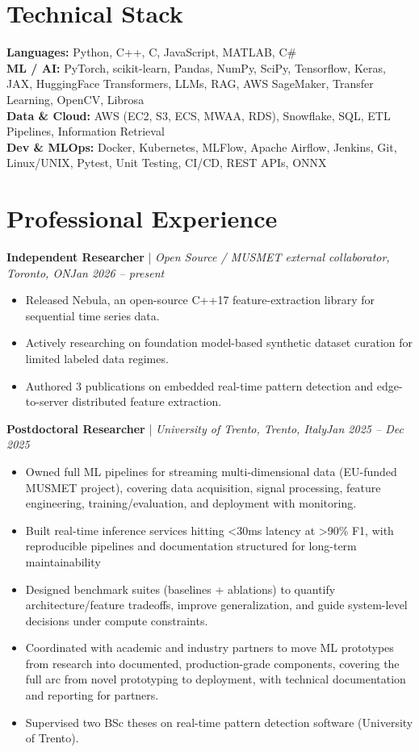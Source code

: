 \documentclass[11pt]{article}
\newenvironment{cvrole}[5]{%
  \par\noindent\textbf{\large #1} | \textit{\small #2, #3}\hfill \textit{\small #4 -- #5}\par
  \begin{itemize}[leftmargin=2em, itemsep=-0.3em, topsep=-0.5em]%
}{%
  \end{itemize}\par\noindent\mbox{}\par\vspace{0.1em}%
}
\begin{document}
\section*{Technical Stack}
\textbf{Languages:} Python, C++, C, JavaScript, MATLAB, C\#\\
\textbf{ML / AI:} PyTorch, scikit-learn, Pandas, NumPy, SciPy, Tensorflow, Keras, JAX, HuggingFace Transformers, LLMs, RAG, AWS SageMaker, Transfer Learning, OpenCV, Librosa\\
\textbf{Data \& Cloud:} AWS (EC2, S3, ECS, MWAA, RDS), Snowflake, SQL, ETL Pipelines, Information Retrieval\\
\textbf{Dev \& MLOps:} Docker, Kubernetes, MLFlow, Apache Airflow, Jenkins, Git, Linux/UNIX, Pytest, Unit Testing, CI/CD, REST APIs, ONNX

\section*{Professional Experience}
\begin{cvrole}{Independent Researcher}{Open Source / MUSMET external collaborator}{Toronto, ON}{Jan 2026}{present}
    \item Released Nebula, an open-source C++17 feature-extraction library for sequential time series data.
    \item Actively researching on foundation model-based synthetic dataset curation for limited labeled data regimes.
    \item Authored 3 publications on embedded real-time pattern detection and edge-to-server distributed feature extraction.
\end{cvrole}

\begin{cvrole}{Postdoctoral Researcher}{University of Trento}{Trento, Italy}{Jan 2025}{Dec 2025}
    \item Owned full ML pipelines for streaming multi-dimensional data (EU-funded MUSMET project), covering data acquisition, signal processing, feature engineering, training/evaluation, and deployment with monitoring.
    \item Built real-time inference services hitting <30ms latency at >90\% F1, with reproducible pipelines and documentation structured for long-term maintainability
    \item Designed benchmark suites (baselines + ablations) to quantify architecture/feature tradeoffs, improve generalization, and guide system-level decisions under compute constraints.
    \item Coordinated with academic and industry partners to move ML prototypes from research into documented, production-grade components, covering the full arc from novel prototyping to deployment, with technical documentation and reporting for partners.
    \item Supervised two BSc theses on real-time pattern detection software (University of Trento).
\end{cvrole}
\end{document}
